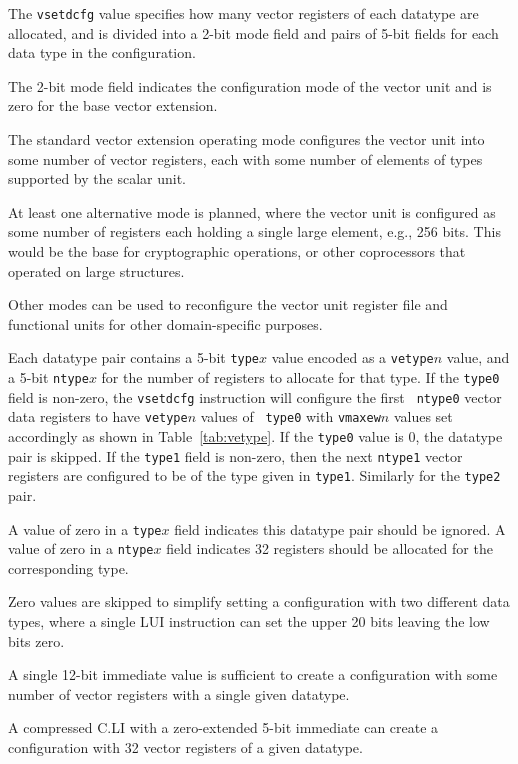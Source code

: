 The {\tt vsetdcfg} value specifies how many vector registers of each
datatype are allocated, and is divided into a 2-bit mode field and
pairs of 5-bit fields for each data type in the configuration.

The 2-bit mode field indicates the configuration mode of the vector
unit and is zero for the base vector extension.

\begin{commentary}
  The standard vector extension operating mode configures the vector
  unit into some number of vector registers, each with some number of
  elements of types supported by the scalar unit.

  At least one alternative mode is planned, where the vector unit is
  configured as some number of registers each holding a single large
  element, e.g., 256 bits.  This would be the base for cryptographic
  operations, or other coprocessors that operated on large structures.

  Other modes can be used to reconfigure the vector unit register file
  and functional units for other domain-specific purposes.
\end{commentary}

Each datatype pair contains a 5-bit {\tt type}$x$ value encoded as a
{\tt vetype}$n$ value, and a 5-bit {\tt ntype}$x$ for the number of
registers to allocate for that type. If the {\tt type0} field is
non-zero, the {\tt vsetdcfg} instruction will configure the first {\tt
  ntype0} vector data registers to have {\tt vetype}$n$ values of {\tt
  type0} with {\tt vmaxew}$n$ values set accordingly as shown in
Table~\ref{tab:vetype}.  If the {\tt type0} value is 0, the datatype
pair is skipped.  If the {\tt type1} field is non-zero, then the next
{\tt ntype1} vector registers are configured to be of the type given
in {\tt type1}.  Similarly for the {\tt type2} pair.

A value of zero in a {\tt type}$x$ field indicates this datatype pair
should be ignored.  A value of zero in a {\tt ntype}$x$ field
indicates 32 registers should be allocated for the corresponding type.

\begin{commentary}
Zero values are skipped to simplify setting a configuration with two
different data types, where a single LUI instruction can set the upper
20 bits leaving the low bits zero.

A single 12-bit immediate value is sufficient to create a
configuration with some number of vector registers with a single given
datatype.

A compressed C.LI with a zero-extended 5-bit immediate can create a
configuration with 32 vector registers of a given datatype.
\end{commentary}

